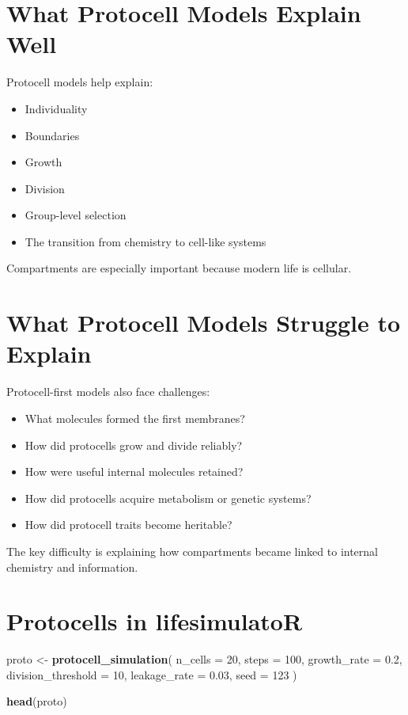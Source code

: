 \documentclass[
  oneside,
  openany]{book}
\newenvironment{Shaded}{\begin{snugshade}}{\end{snugshade}}
\newcommand{\AttributeTok}[1]{\textcolor[rgb]{0.13,0.29,0.53}{#1}}
\newcommand{\DecValTok}[1]{\textcolor[rgb]{0.00,0.00,0.81}{#1}}
\newcommand{\FloatTok}[1]{\textcolor[rgb]{0.00,0.00,0.81}{#1}}
\newcommand{\FunctionTok}[1]{\textcolor[rgb]{0.13,0.29,0.53}{\textbf{#1}}}
\newcommand{\NormalTok}[1]{#1}
\newcommand{\OtherTok}[1]{\textcolor[rgb]{0.56,0.35,0.01}{#1}}
\providecommand{\tightlist}{%
  \setlength{\itemsep}{0pt}\setlength{\parskip}{0pt}}
\begin{document}
\section{What Protocell Models Explain Well}\label{what-protocell-models-explain-well}

Protocell models help explain:

\begin{itemize}
\tightlist
\item
  Individuality
\item
  Boundaries
\item
  Growth
\item
  Division
\item
  Group-level selection
\item
  The transition from chemistry to cell-like systems
\end{itemize}

Compartments are especially important because modern life is cellular.

\section{What Protocell Models Struggle to Explain}\label{what-protocell-models-struggle-to-explain}

Protocell-first models also face challenges:

\begin{itemize}
\tightlist
\item
  What molecules formed the first membranes?
\item
  How did protocells grow and divide reliably?
\item
  How were useful internal molecules retained?
\item
  How did protocells acquire metabolism or genetic systems?
\item
  How did protocell traits become heritable?
\end{itemize}

The key difficulty is explaining how compartments became linked to internal chemistry and information.

\section{Protocells in lifesimulatoR}\label{protocells-in-lifesimulator}

\begin{Shaded}
\begin{Highlighting}[]
\NormalTok{proto }\OtherTok{\textless{}{-}} \FunctionTok{protocell\_simulation}\NormalTok{(}
  \AttributeTok{n\_cells =} \DecValTok{20}\NormalTok{,}
  \AttributeTok{steps =} \DecValTok{100}\NormalTok{,}
  \AttributeTok{growth\_rate =} \FloatTok{0.2}\NormalTok{,}
  \AttributeTok{division\_threshold =} \DecValTok{10}\NormalTok{,}
  \AttributeTok{leakage\_rate =} \FloatTok{0.03}\NormalTok{,}
  \AttributeTok{seed =} \DecValTok{123}
\NormalTok{)}

\FunctionTok{head}\NormalTok{(proto)}
\end{Highlighting}
\end{Shaded}
\end{document}
